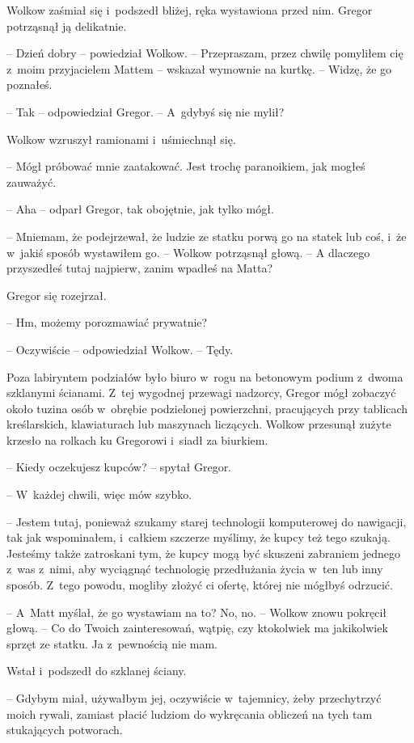 \documentclass[oneside,polish,12pt,sfheadings]{mwbk}
\begin{document}
Wolkow zaśmiał się i~podszedł bliżej, ręka wystawiona przed nim. Gregor
potrząsnął ją delikatnie.

-- Dzień dobry -- powiedział Wolkow. -- Przepraszam, przez chwilę pomyliłem
cię z~moim przyjacielem Mattem -- wskazał wymownie na kurtkę. -- Widzę, że
go poznałeś.

-- Tak -- odpowiedział Gregor. -- A~gdybyś się nie mylił?

Wolkow wzruszył ramionami i~uśmiechnął się. 

-- Mógł próbować mnie
zaatakować. Jest trochę paranoikiem, jak mogłeś zauważyć.

-- Aha -- odparł Gregor, tak obojętnie, jak tylko mógł.

-- Mniemam, że podejrzewał, że ludzie ze statku porwą go na statek lub
coś, i~że w~jakiś sposób wystawiłem go. -- Wolkow potrząsnął głową. -- A
dlaczego przyszedłeś tutaj najpierw, zanim wpadłeś na Matta?

Gregor się rozejrzał.

-- Hm, możemy porozmawiać prywatnie?

-- Oczywiście -- odpowiedział Wolkow. -- Tędy.

Poza labiryntem podziałów było biuro w~rogu na betonowym podium z~dwoma
szklanymi ścianami. Z~tej wygodnej przewagi nadzorcy, Gregor mógł
zobaczyć około tuzina osób w~obrębie podzielonej powierzchni,
pracujących przy tablicach kreślarskich, klawiaturach lub maszynach
liczących. Wolkow przesunął zużyte krzesło na rolkach ku Gregorowi i~siadł za biurkiem.

-- Kiedy oczekujesz kupców? -- spytał Gregor.

-- W~każdej chwili, więc mów szybko.

-- Jestem tutaj, ponieważ szukamy starej technologii komputerowej do
nawigacji, tak jak wspominałem, i~całkiem szczerze myślimy, że kupcy też
tego szukają. Jesteśmy także zatroskani tym, że kupcy mogą być skuszeni
zabraniem jednego z~was z~nimi, aby wyciągnąć technologię przedłużania
życia w~ten lub inny sposób. Z~tego powodu, mogliby złożyć ci ofertę,
której nie mógłbyś odrzucić.

-- A~Matt myślał, że go wystawiam na to? No, no. -- Wolkow znowu pokręcił
głową. -- Co do Twoich zainteresowań, wątpię, czy ktokolwiek ma
jakikolwiek sprzęt ze statku. Ja z~pewnością nie mam.

Wstał i~podszedł do szklanej ściany. 

-- Gdybym miał, używałbym jej,
oczywiście w~tajemnicy, żeby przechytrzyć moich rywali, zamiast płacić
ludziom do wykręcania obliczeń na tych tam stukających potworach.
\end{document}

